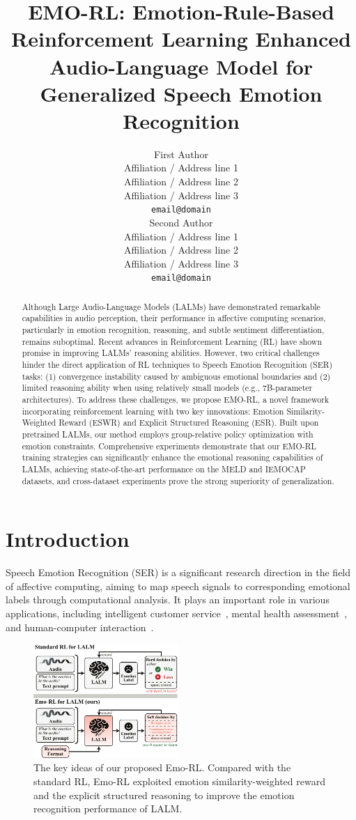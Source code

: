 \documentclass[11pt]{article}
\title{EMO-RL: Emotion-Rule-Based Reinforcement Learning Enhanced Audio-Language Model for Generalized Speech Emotion Recognition}
\author{First Author \\
  Affiliation / Address line 1 \\
  Affiliation / Address line 2 \\
  Affiliation / Address line 3 \\
  \texttt{email@domain} \\\And
  Second Author \\
  Affiliation / Address line 1 \\
  Affiliation / Address line 2 \\
  Affiliation / Address line 3 \\
  \texttt{email@domain} \\}
\begin{document}
\maketitle
\begin{abstract}
	Although Large Audio-Language Models (LALMs) have demonstrated remarkable capabilities in audio perception, their performance in affective computing scenarios, particularly in emotion recognition, reasoning, and subtle sentiment differentiation, remains suboptimal.
	Recent advances in Reinforcement Learning (RL) have shown promise in improving LALMs' reasoning abilities.
	However, two critical challenges hinder the direct application of RL techniques to Speech Emotion Recognition (SER) tasks: (1) convergence instability caused by ambiguous emotional boundaries and (2) limited reasoning ability when using relatively small models (e.g., 7B-parameter architectures).
	To address these challenges, we propose EMO-RL, a novel framework incorporating reinforcement learning with two key innovations: Emotion Similarity-Weighted Reward (ESWR) and Explicit Structured Reasoning (ESR).
	Built upon pretrained LALMs, our method employs group-relative policy optimization with emotion constraints.
	Comprehensive experiments demonstrate that our EMO-RL training strategies can significantly enhance the emotional reasoning capabilities of LALMs, achieving state-of-the-art performance on the MELD and IEMOCAP datasets, and cross-dataset experiments prove the strong superiority of generalization.
\end{abstract}

\section{Introduction}
Speech Emotion Recognition (SER) is a significant research direction in the field of affective computing, aiming to map speech signals to corresponding emotional labels through computational analysis. It plays an important role in various applications, including intelligent customer service~\citep{li2021speech}, mental health assessment~\citep{madanian2022automatic}, and human-computer interaction~\citep{alsabhan2023human}.

\begin{figure}[h]
	\centering
	\includegraphics[width=0.49\textwidth]{img/motivation.pdf}
	\caption{The key ideas of our proposed Emo-RL. Compared with the standard RL, Emo-RL exploited emotion similarity-weighted reward and the explicit structured reasoning to improve the emotion recognition performance of LALM.}
	\label{fig:motivation}
\end{figure}
\end{document}
